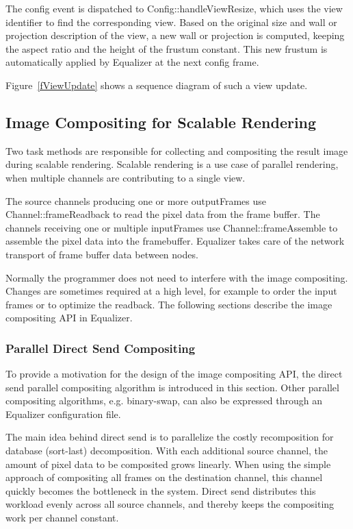 \documentclass[10pt,a4]{scrartcl}
\newcommand{\fig}[1]{Figure~\ref{#1}}
\begin{document}
The config event is dispatched to \textsf{Config::handleView\-Resize},
which uses the view identifier to find the corresponding view. Based on
the original size and wall or projection description of the view, a new
wall or projection is computed, keeping the aspect ratio and  the height
of the frustum constant. This new frustum is automatically applied by
Equalizer at the next config frame.

\fig{fViewUpdate} shows a sequence diagram of such a view update.

\subsection{\label{sCompositing}Image Compositing for Scalable Rendering}

Two task methods are responsible for collecting and compositing the
result image during scalable rendering. Scalable rendering is a use case
of parallel rendering, when multiple channels are contributing to a single
view. 

The source channels producing one or more \textsf{outputFrame}s use
\textsf{Channel::frame\-Read\-back} to read the pixel data from the frame
buffer. The channels receiving one or multiple \textsf{inputFrame}s use
\textsf{Channel::frameAssemb\-le} to assemble the pixel data into the
framebuffer. Equalizer takes care of the network transport of frame
buffer data between nodes.

Normally the programmer does not need to interfere with the image
compositing. Changes are sometimes required at a high level, for example
to order the input frames or to optimize the readback. The following
sections describe the image compositing API in Equalizer.

\subsubsection{\label{sDirectSend}Parallel Direct Send Compositing}

To provide a motivation for the design of the image compositing
API, the direct send parallel compositing algorithm is introduced in this
section. Other parallel compositing algorithms, e.g. binary-swap, can
also be expressed through an Equalizer configuration file.

The main idea behind direct send is to parallelize the costly
recomposition for database (sort-last) decomposition. With each
additional source channel, the amount of pixel data to be composited
grows linearly. When using the simple approach of compositing all frames
on the destination channel, this channel quickly becomes the bottleneck
in the system. Direct send distributes this workload evenly across all
source channels, and thereby keeps the compositing work per channel
constant.
\end{document}
